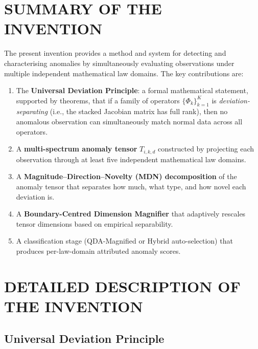 \documentclass[12pt,a4paper]{article}
\begin{document}
\section{SUMMARY OF THE INVENTION}

The present invention provides a method and system for detecting and 
characterising anomalies by simultaneously evaluating observations under 
multiple independent mathematical law domains. The key contributions are:

\begin{enumerate}[label=(\roman*)]
\item The \textbf{Universal Deviation Principle}: a formal mathematical 
statement, supported by theorems, that if a family of operators 
$\{\Phi_k\}_{k=1}^{K}$ is \emph{deviation-separating} (i.e., the stacked 
Jacobian matrix has full rank), then no anomalous observation can 
simultaneously match normal data across all operators.

\item A \textbf{multi-spectrum anomaly tensor} $T_{i,k,d}$ constructed by 
projecting each observation through at least five independent mathematical 
law domains.

\item A \textbf{Magnitude--Direction--Novelty (MDN) decomposition} of the 
anomaly tensor that separates how much, what type, and how novel each 
deviation is.

\item A \textbf{Boundary-Centred Dimension Magnifier} that adaptively 
rescales tensor dimensions based on empirical separability.

\item A classification stage (QDA-Magnified or Hybrid auto-selection) that 
produces per-law-domain attributed anomaly scores.
\end{enumerate}

\section{DETAILED DESCRIPTION OF THE INVENTION}

\subsection{Universal Deviation Principle}
\end{document}
